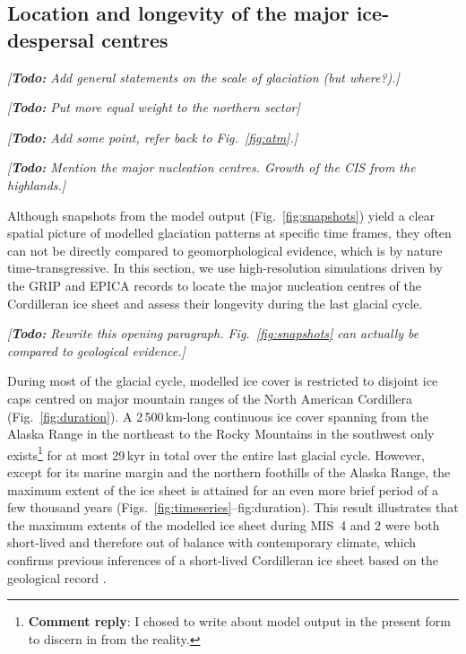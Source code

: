 \documentclass[tc, manuscript]{copernicus}
\newcommand{\renote}[1]{\footnote{\textbf{Comment reply}: #1}}
\newcommand{\todo}[1]{\emph{[\textbf{Todo:} #1]}}
\begin{document}
\subsection{Location and longevity of the major ice-despersal centres}

\todo{Add general statements on the scale of glaciation (but where?).}

\todo{Put more equal weight to the northern sector}

\todo{Add some point, refer back to Fig.~\ref{fig:atm}.}

\todo{Mention the major nucleation centres. Growth of the CIS from the
      highlands.}

Although snapshots from the model output (Fig.~\ref{fig:snapshots}) yield a
clear spatial picture of modelled glaciation patterns at specific time frames,
they often can not be directly compared to geomorphological evidence, which is
by nature time-transgressive. In this section, we use high-resolution
simulations driven by the GRIP and EPICA records to locate the major nucleation
centres of the Cordilleran ice sheet and assess their longevity during the last
glacial cycle.

\todo{Rewrite this opening paragraph. Fig.~\ref{fig:snapshots} can actually be
      compared to geological evidence.}

During most of the glacial cycle, modelled ice cover is restricted to disjoint
ice caps centred on major mountain ranges of the North American Cordillera
(Fig.~\ref{fig:duration}). A 2\,500\,km-long continuous ice cover spanning from
the Alaska Range in the northeast to the Rocky Mountains in the southwest only
exists\renote{
    I chosed to write about model output in the present form to discern in from
    the reality.}
for at most 29\,kyr in total over the entire last glacial cycle. However,
except for its marine margin and the northern foothills of the Alaska Range,
the maximum extent of the ice sheet is attained for an even more brief period
of a few thousand years (Figs.~\ref{fig:timeseries}--{fig:duration}). This
result illustrates that the maximum extents of the modelled ice sheet during
MIS~4 and 2 were both short-lived and therefore out of balance with
contemporary climate, which confirms previous inferences of a short-lived
Cordilleran ice sheet based on the geological record \citep{Clague.etal.1980,
Stroeven.etal.2010}.
\end{document}
